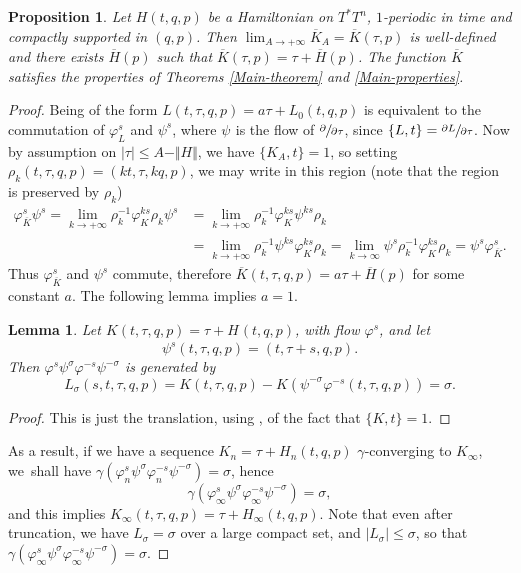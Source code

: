 \documentclass[JEP,XML,SOM,NoFloatCountersInSection,Unicode,published]{cedram}
\numberwithin{equation}{section}
\theoremstyle{plain}
\newtheorem{lemma}[theorem]{Lemma}
\newtheorem{proposition}[theorem]{Proposition}
\theoremstyle{definition}
\theoremstyle{remark}
\begin{document}
\begin{proposition} \label{Prop-12.6}
Let $H(t,q,p)$ be a Hamiltonian on $T^*T^n$, $1$-periodic in time and compactly supported in $(q,p)$. Then $ \lim_{A\to +\infty }\overline K_{A}=\overline K(\tau,p)$ is well-defined and there exists ${\overline H}(p)$ such that $\overline K(\tau,p)= \tau +\overline H(p)$. The function $\overline K$ satisfies the properties of Theorems \ref{Main-theorem} and \ref{Main-properties}.
\end{proposition}

\begin{proof}
Being of the form $L(t,\tau,q,p)= a \tau + L_{0}(t,q,p)$ is equivalent to the commutation of $\varphi_{L}^{s}$ and $\psi_{}^s$, where $\psi_{}$ is the flow of $\sfrac {\partial}{\partial \tau}$, since $\{L, t\}= \sfrac{\partial L}{\partial \tau}$. Now by assumption on $\vert \tau \vert \leq A- \Vert H \Vert $, we have $\{K_A,t\}=1$, so setting $\rho_{k}(t,\tau,q,p)=(kt, \tau, kq,p)$, we may write in this region (note that the region is preserved by $\rho_k$)
\begin{align*}
\varphi_{\overline K}^s \psi^s= \lim_{k \to +\infty }\rho_{k}^{-1}\varphi_{K}^{ks}\rho_{k} \psi^s &=\lim_{k \to +\infty } \rho_k^{-1}\varphi_{K}^{ks}\psi^{ks}\rho_{k}\\
&=\lim_{k \to +\infty }
\rho_{k}^{-1}\psi^{ks} \varphi_{K}^{ks} \rho_{k}=\lim_{k\to \infty} \psi^s \rho_{k}^{-1}\varphi_{K}^{ks}\rho_{k} =
\psi^s \varphi_{\overline K}^s.
\end{align*}
Thus $\varphi_{\overline K}^s$ and $\psi^s$ commute, therefore $\overline K(t,\tau,q,p)=a\tau + \overline H (p)$ for some constant $a$. The following lemma implies $a=1$.

\begin{lemma}
Let $K(t,\tau,q,p)=\tau+H_{}(t,q,p)$, with flow $\varphi_{}^s$, and let
\[
\psi^s(t,\tau,q,p)=(t,\tau+s,q,p).
\]
Then $\varphi^s\psi^{\sigma}\varphi^{-s}\psi^{-\sigma}$ is generated by
\[
L_{\sigma}(s,t,\tau,q,p)=K(t,\tau,q,p)-K(\psi^{-\sigma}\varphi^{-s}(t,\tau,q,p))=\sigma.
\]
\end{lemma}

\begin{proof}
This is just the translation, using \cite{Cardin-Viterbo}, of the fact that $\{K,t\}=1$.
\end{proof}
As a result, if we have a sequence $K_{n}=\tau+H_{n}(t,q,p)$ $\gamma$-converging to $K_{\infty}$, we~shall have $\gamma (\varphi_{n}^s\psi^{\sigma}\varphi_{n}^{-s}\psi^{-\sigma})=\sigma$, hence
\[
\gamma (\varphi_{\infty}^s\psi^{\sigma}\varphi_{\infty}^{-s}\psi^{-\sigma})=\sigma,
\]
and this implies $K_{\infty}(t,\tau,q,p)=\tau+H_{\infty}(t,q,p)$. Note that even after truncation, we have $L_{\sigma}\!=\!\sigma$ over a large compact set, and $ \vert L_{\sigma} \vert \!\leq\! \sigma$, so that $\gamma (\varphi_{\infty}^s\psi^{\sigma}\varphi_{\infty}^{-s}\psi^{-\sigma})\!=\!\sigma$.
\end{proof}
\end{document}

